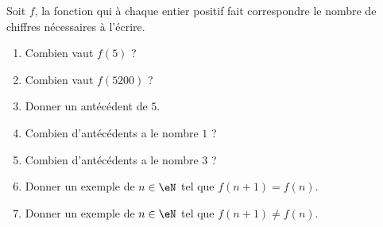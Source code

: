 
\begin{exercice}\label{exoSeconde-0054}

    Soit \( f\), la fonction qui à chaque entier positif fait correspondre le nombre de chiffres nécessaires à l'écrire.
    \begin{multicols}{2}
        \begin{enumerate}
            \item
            Combien vaut \( f(5)\) ?
        \item
            Combien vaut \( f(5200)\) ?
        \item
            Donner un antécédent de \( 5\).
        \item
            Combien d'antécédents a le nombre \( 1\) ?
        \item
            Combien d'antécédents a le nombre \( 3\) ?
        \item
            Donner un exemple de \( n\in \eN\) tel que \( f(n+1)=f(n)\).
        \item
            Donner un exemple de \( n\in \eN\) tel que \( f(n+1)\neq f(n)\).
        \end{enumerate}
    \end{multicols}

\end{exercice}

